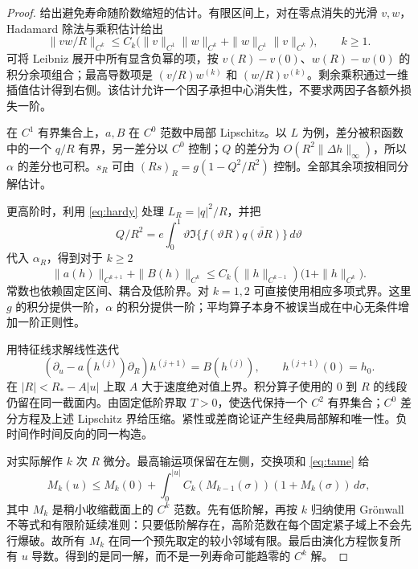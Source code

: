 \begin{proof}
给出避免寿命随阶数缩短的估计。有限区间上，对在零点消失的光滑 $v,w$，Hadamard 除法与乘积估计给出
\begin{equation}\label{eq:hardy}
\|vw/R\|_{C^k}\le C_k\big(\|v\|_{C^1}\|w\|_{C^k}
+\|w\|_{C^1}\|v\|_{C^k}\big),\qquad k\ge1.
\end{equation}
可将 Leibniz 展开中所有显含负幂的项，按 $v(R)-v(0)$、$w(R)-w(0)$ 的积分余项组合；最高导数项是 $(v/R)w^{(k)}$ 和 $(w/R)v^{(k)}$。剩余乘积通过一维插值估计得到右侧。该估计允许一个因子承担中心消失性，不要求两因子各额外损失一阶。

在 $C^1$ 有界集合上，$a,B$ 在 $C^0$ 范数中局部 Lipschitz。以 $L$ 为例，差分被积函数中的一个 $q/R$ 有界，另一差分以 $C^0$ 控制；$Q$ 的差分为 $O(R^2\|\Delta h\|_\infty)$，所以 $\alpha$ 的差分也可积。$s_R$ 可由 $(Rs)_R=g(1-Q^2/R^2)$ 控制。全部其余项按相同分解估计。

更高阶时，利用 \eqref{eq:hardy} 处理 $L_R=|q|^2/R$，并把
\[
Q/R^2=e\int_0^1\vartheta\Im\{f(\vartheta R)\overline{q(\vartheta R)}\}\,d\vartheta
\]
代入 $\alpha_R$，得到对于 $k\ge2$
\begin{equation}\label{eq:tame}
\|a(h)\|_{C^{k+1}}+\|B(h)\|_{C^k}
\le C_k(\|h\|_{C^{k-1}})\big(1+\|h\|_{C^k}\big).
\end{equation}
常数也依赖固定区间、耦合及低阶界。对 $k=1,2$ 可直接使用相应多项式界。这里 $g$ 的积分提供一阶，$\alpha$ 的积分提供一阶；平均算子本身不被误当成在中心无条件增加一阶正则性。

用特征线求解线性迭代
\[
(\partial_u-a(h^{(j)})\partial_R)h^{(j+1)}=B(h^{(j)}),
\qquad h^{(j+1)}(0)=h_0.
\]
在 $|R|<R_*-A|u|$ 上取 $A$ 大于速度绝对值上界。积分算子使用的 $0$ 到 $R$ 的线段仍留在同一截面内。由固定低阶界取 $T>0$，使迭代保持一个 $C^2$ 有界集合；$C^0$ 差分方程及上述 Lipschitz 界给压缩。紧性或差商论证产生经典局部解和唯一性。负时间作时间反向的同一构造。

对实际解作 $k$ 次 $R$ 微分。最高输运项保留在左侧，交换项和 \eqref{eq:tame} 给
\begin{equation}\label{eq:highenergy}
M_k(u)\le M_k(0)+\int_0^{|u|}C_k(M_{k-1}(\sigma))(1+M_k(\sigma))\,d\sigma,
\end{equation}
其中 $M_k$ 是稍小收缩截面上的 $C^k$ 范数。先有低阶解，再按 $k$ 归纳使用 Gr\"onwall 不等式和有限阶延续准则：只要低阶解存在，高阶范数在每个固定紧子域上不会先行爆破。故所有 $M_k$ 在同一个预先取定的较小邻域有限。最后由演化方程恢复所有 $u$ 导数。得到的是同一解，而不是一列寿命可能趋零的 $C^k$ 解。\qedhere
\end{proof}

